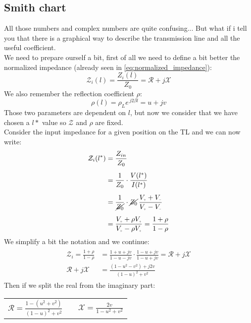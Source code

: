 \subsection*{Smith chart}
All those numbers and complex numbers are quite confusing... But what if i tell you that there is a graphical way to describe the transmission line and all the useful coefficient.\\
We need to prepare ourself a bit, first of all we need to define a bit better the normalized impedance (already seen in \cref{eq:normalized_impedance}):
\begin{equation}
    \mathcal{Z}_i(l)=\frac{Z_i(l)}{Z_0}=\mathcal{R}+j\mathcal{X}
\end{equation}
We also remember the reflection coefficient $\rho$:
\begin{equation}
    \rho(l)=\rho_L e^{\,j2\beta l}=u+jv
\end{equation}
Those two parameters are dependent on $l$, but now we consider that we have chosen a $l*$ value so $\mathcal{Z}$ and $\rho$ are fixed.\\
Consider the input impedance for a given position on the TL and we can now write:
\begin{align}
    \begin{split}
        \mathcal{Z}_i(l^*) &=\frac{Z_{in}}{Z_0}\\[5pt]
        &=\frac{1}{Z_0}\cdot \frac{V(l^*)}{I(l^*)}\\[5pt]
        &=\frac{1}{\cancel{Z_0}}\cdot \cancel{Z_0} \,\frac{V\bottomPlus +V\bottomMinus }{V\bottomPlus -V\bottomMinus }\\[5pt]
        &= \frac{V\bottomPlus +\rho V\bottomPlus }{V\bottomPlus -\rho V\bottomPlus } = \frac{1 +\rho }{1 -\rho }
    \end{split}
\end{align}
We simplify a bit the notation and we continue:
\begin{align}
    \begin{split}
        \mathcal{Z}_i =\frac{1+\rho}{1-\rho}& =\frac{1+u+jv}{1-u-jv}\cdot \frac{1-u+jv}{ 1-u+jv}=\mathcal{R}+j\mathcal{X}\\[5pt]
        \mathcal{R}+j\mathcal{X}&=\frac{(1-u^2-v^2)+j2v}{(1-u)^2+v^2}
    \end{split}
\end{align}
Then if we split the real from the imaginary part:
\begin{center}
    \begin{tabular}{ c c c }
        $\mathcal{R}=\frac{1-(u^2+v^2)}{(1-u)^2+v^2}$&
        &
        $\mathcal{X}=\frac{2v}{1-u^2+v^2}$
    \end{tabular}
\end{center}

